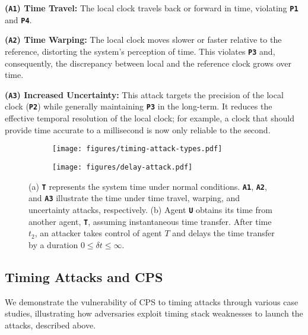 \noindent\textbf{(\texttt{A1}) Time Travel:} The local clock travels back or forward in time, violating \textbf{\texttt{P1}} and \textbf{\texttt{P4}}.

\noindent\textbf{(\texttt{A2}) Time Warping:} The local clock moves slower or faster relative to the reference, distorting the system's perception of time. This violates \textbf{\texttt{P3}} and, consequently, the discrepancy between local and the reference clock grows over time.

\noindent\textbf{(\texttt{A3}) Increased Uncertainty:} This attack targets the precision of the local clock (\textbf{\texttt{P2}}) while generally maintaining \textbf{\texttt{P3}} in the long-term. It reduces the effective temporal resolution of the local clock; for example, a clock that should provide time accurate to a millisecond is now only reliable to the second.

\begin{figure}[ht]
    \small
    \centering
    \begin{subfigure}{0.48\columnwidth}
        \centering
        \texttt{[image: figures/timing-attack-types.pdf]}
        \caption{}
        \label{fig:attack-types}
    \end{subfigure}
    \hspace{0.2em}
    \begin{subfigure}{0.48\columnwidth}
        \centering
        \texttt{[image: figures/delay-attack.pdf]}
        \caption{}
        \label{fig:delay-attack}
    \end{subfigure}
    \caption{(a) \textbf{\texttt{T}} represents the system time under normal conditions. \textbf{\texttt{A1}}, \textbf{\texttt{A2}}, and \textbf{\texttt{A3}} illustrate the time under time travel, warping, and uncertainty attacks, respectively. (b) Agent \textbf{\texttt{U}} obtains its time from another agent, \textbf{\texttt{T}}, assuming instantaneous time transfer. After time $t_2$, an attacker takes control of agent $T$ and delays the time transfer by a duration $0 \leq \delta t \leq \infty$.} 
    \label{fig:timing-attack-types}
\end{figure}

\subsection{Timing Attacks and CPS}\label{subsec:case-studies}
We demonstrate the vulnerability of CPS to timing attacks through various case studies, illustrating how adversaries exploit timing stack weaknesses to launch the attacks, described above.


